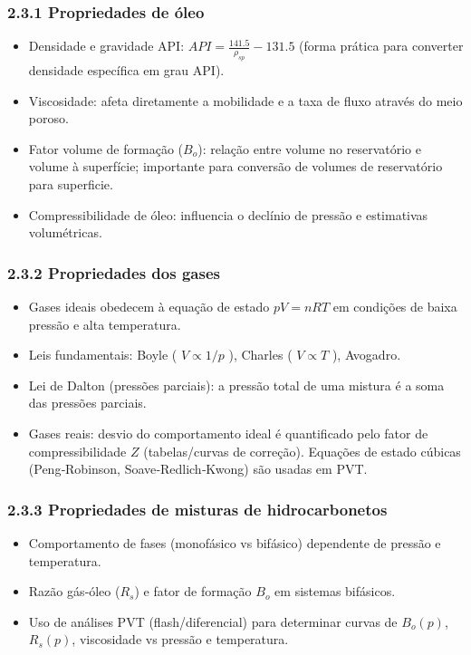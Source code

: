 \documentclass[11pt,a4paper]{article}
\begin{document}
\subsubsection{2.3.1 Propriedades de óleo}
\begin{itemize}
\item Densidade e gravidade API: $API = \frac{141.5}{\rho_{sp}} - 131.5$ (forma prática para converter densidade específica em grau API).
\item Viscosidade: afeta diretamente a mobilidade e a taxa de fluxo através do meio poroso.
\item Fator volume de formação ($B_o$): relação entre volume no reservatório e volume à superfície; importante para conversão de volumes de reservatório para superficie.
\item Compressibilidade de óleo: influencia o declínio de pressão e estimativas volumétricas.
\end{itemize}

\subsubsection{2.3.2 Propriedades dos gases}
\begin{itemize}
\item Gases ideais obedecem à equação de estado $pV = nRT$ em condições de baixa pressão e alta temperatura.
\item Leis fundamentais: Boyle ( $V\propto 1/p$ ), Charles ( $V\propto T$ ), Avogadro.
\item Lei de Dalton (pressões parciais): a pressão total de uma mistura é a soma das pressões parciais.
\item Gases reais: desvio do comportamento ideal é quantificado pelo fator de compressibilidade $Z$ (tabelas/curvas de correção). Equações de estado cúbicas (Peng‑Robinson, Soave‑Redlich‑Kwong) são usadas em PVT.
\end{itemize}

\subsubsection{2.3.3 Propriedades de misturas de hidrocarbonetos}
\begin{itemize}
\item Comportamento de fases (monofásico vs bifásico) dependente de pressão e temperatura.
\item Razão gás‑óleo ($R_s$) e fator de formação $B_o$ em sistemas bifásicos.
\item Uso de análises PVT (flash/diferencial) para determinar curvas de $B_o(p)$, $R_s(p)$, viscosidade vs pressão e temperatura.
\end{itemize}
\end{document}
